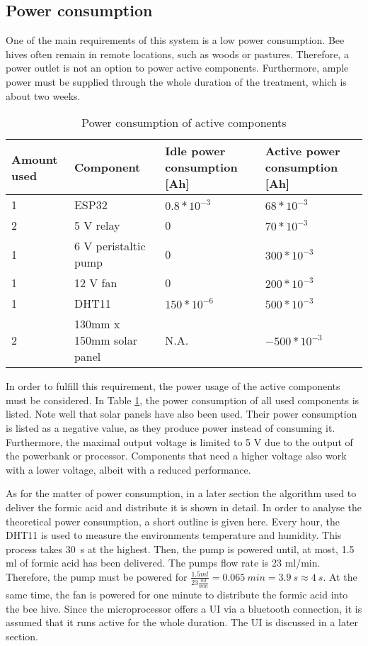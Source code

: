 
\subsection{Power consumption}\label{subsec:power-consumption}

One of the main requirements of this system is a low power consumption.
Bee hives often remain in remote locations, such as woods or pastures.
Therefore, a power outlet is not an option to power active components.
Furthermore, ample power must be supplied through the whole duration of the treatment, which is about two weeks.

\begin{table}
    \centering
    \caption{Power consumption of active components}
    \label{tab:power-consumption-of-active-components}
    \renewcommand{\arraystretch}{1.2}
    \begin{tabular}{l|l|l|l}
        Amount used & Component & Idle power consumption [Ah] & Active power consumption [Ah] \\
        \hline
        1 & ESP32 &  $0.8 * 10^{-3}$ & $68 * 10^{-3}$ \\
        2 & 5 V relay & 0 & $70 * 10^{-3}$ \\
        1 & 6 V peristaltic pump & 0 & $300 * 10^{-3}$ \\
        1 & 12 V fan & 0 & $200 * 10^{-3} $ \\
        1 & DHT11 & $150 * 10^{-6}$ & $500 * 10^{-3}$ \\
        2 & 130mm x 150mm solar panel & N.A. & $- 500 * 10^{-3}$
    \end{tabular}
\end{table}

In order to fulfill this requirement, the power usage of the active components must be considered.
In Table \ref{tab:power-consumption-of-active-components}, the power consumption of all used components is listed.
Note well that solar panels have also been used.
Their power consumption is listed as a negative value, as they produce power instead of consuming it.
Furthermore, the maximal output voltage is limited to 5 V due to the output of the powerbank or processor.
Components that need a higher voltage also work with a lower voltage, albeit with a reduced performance.

As for the matter of power consumption, in a later section the algorithm used to deliver the formic acid and distribute it is shown in detail. %
In order to analyse the theoretical power consumption, a short outline is given here.
Every hour, the DHT11 is used to measure the environments temperature and humidity.
This process takes 30\ s at the highest.
Then, the pump is powered until, at most, 1.5 ml of formic acid has been delivered.
The pumps flow rate is 23 ml/min.
Therefore, the pump must be powered for $\frac{1.5 ml}{23 \frac{ml}{min}} = 0.065\ min = 3.9\ s \approx 4\ s$.
At the same time, the fan is powered for one minute to distribute the formic acid into the bee hive.
Since the microprocessor offers a UI via a bluetooth connection, it is assumed that it runs active for the whole duration.
The UI is discussed in a later section. %

